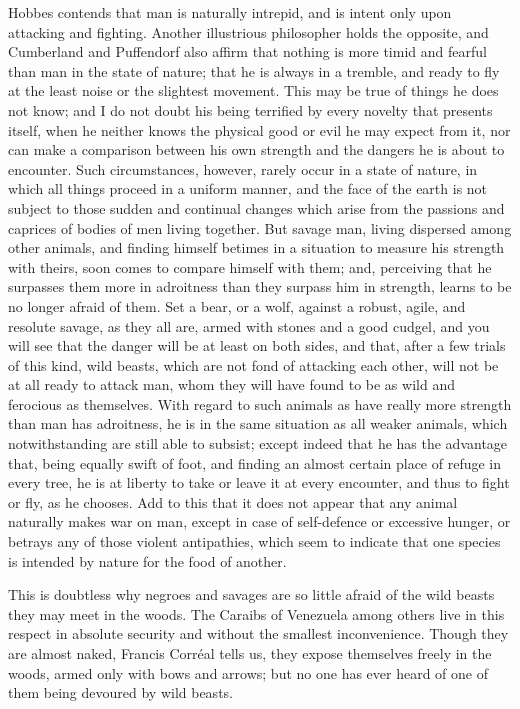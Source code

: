 \documentclass[12pt]{report}
\begin{document}
Hobbes contends that man is naturally intrepid, and is intent only upon attacking and fighting. Another illustrious philosopher holds the opposite, and Cumberland and Puffendorf also affirm that nothing is more timid and fearful than man in the state of nature; that he is always in a tremble, and ready to fly at the least noise or the slightest movement. This may be true of things he does not know; and I do not doubt his being terrified by every novelty that presents itself, when he neither knows the physical good or evil he may expect from it, nor can make a comparison between his own strength and the dangers he is about to encounter. Such circumstances, however, rarely occur in a state of nature, in which all things proceed in a uniform manner, and the face of the earth is not subject to those sudden and continual changes which arise from the passions and caprices of bodies of men living together. But savage man, living dispersed among other animals, and finding himself betimes in a situation to measure his strength with theirs, soon comes to compare himself with them; and, perceiving that he surpasses them more in adroitness than they surpass him in strength, learns to be no longer afraid of them. Set a bear, or a wolf, against a robust, agile, and resolute savage, as they all are, armed with stones and a good cudgel, and you will see that the danger will be at least on both sides, and that, after a few trials of this kind, wild beasts, which are not fond of attacking each other, will not be at all ready to attack man, whom they will have found to be as wild and ferocious as themselves. With regard to such animals as have really more strength than man has adroitness, he is in the same situation as all weaker animals, which notwithstanding are still able to subsist; except indeed that he has the advantage that, being equally swift of foot, and finding an almost certain place of refuge in every tree, he is at liberty to take or leave it at every encounter, and thus to fight or fly, as he chooses. Add to this that it does not appear that any animal naturally makes war on man, except in case of self-defence or excessive hunger, or betrays any of those violent antipathies, which seem to indicate that one species is intended by nature for the food of another.

This is doubtless why negroes and savages are so little afraid of the wild beasts they may meet in the woods. The Caraibs of Venezuela among others live in this respect in absolute security and without the smallest inconvenience. Though they are almost naked, Francis Corréal tells us, they expose themselves freely in the woods, armed only with bows and arrows; but no one has ever heard of one of them being devoured by wild beasts.
\end{document}
